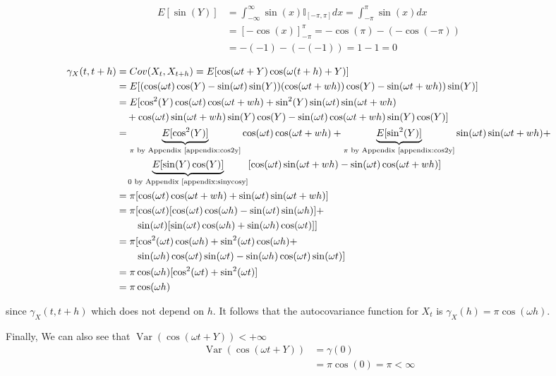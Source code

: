 \documentclass{article}
\DeclareMathOperator{\Var}{Var}
\begin{document}
\begin{align*}
E[\sin(Y)] &= \int_{-\infty}^{\infty} \sin(x) \mathbb{I}_{[-\pi, \pi]} dx = \int_{-\pi}^{\pi} \sin(x) dx\\
& = [-\cos(x)]^{\pi}_{-\pi} = -\cos(\pi) - (- \cos(-\pi)) \\
& = -(-1) - ( - (-1)) = 1 - 1 = 0
\end{align*}


\begin{align*}
\gamma_X(t,t + h) &= Cov(X_{t}, X_{t + h}) = E[\cos(\omega t + Y)\cos(\omega (t+h) + Y)] \\
 &= E[(\cos(\omega t)\cos(Y) - \sin(\omega t)\sin(Y))(\cos(\omega t + wh))\cos(Y) - \sin(\omega t + wh))\sin(Y)] \\
 &= E[\cos^2(Y)\cos(\omega t)\cos(\omega t + wh) + \sin^2(Y)\sin(\omega t)\sin(\omega t + wh)\\
 & \quad + \cos(\omega t)\sin(\omega t + wh)\sin(Y)\cos(Y) - \sin(\omega t)\cos(\omega t + wh)\sin(Y)\cos(Y)]\\
 & = \underbrace{E[\cos^2(Y)]}_{\pi \text{ by Appendix \ref{appendix:cos2y}}} \cos(\omega t)\cos(\omega t + wh) + \underbrace{E[\sin^2(Y)]}_{\pi \text{ by Appendix \ref{appendix:cos2y}}} \sin(\omega t)\sin(\omega t + wh) +\\
 & \quad \underbrace{E[\sin(Y)\cos(Y)]}_{\text{0 by Appendix \ref{appendix:sinycosy}}} [\cos(\omega t)\sin(\omega t + wh) - \sin(\omega t)\cos(\omega t + wh)]\\
 &= \pi [\cos(\omega t)\cos(\omega t + wh) + \sin(\omega t)\sin(\omega t + wh)]\\
 &= \pi [
 \cos(\omega t)[\cos(\omega t) \cos(\omega h) - \sin(\omega t) \sin(\omega h)] +\\
 &\qquad \sin(\omega t)[\sin(\omega t) \cos(\omega h) + \sin(\omega h) \cos(\omega t)]]\\
 &= \pi [
  \cos^2(\omega t) \cos(\omega h) + \sin^2(\omega t) \cos(\omega h) +\\
  &\qquad \sin(\omega h)\cos(\omega t)\sin(\omega t) - \sin(\omega h)\cos(\omega t)\sin(\omega t)
 ]\\
 &= \pi \cos(\omega h) [\cos^2(\omega t) + \sin^2(\omega t)]\\
 &= \pi \cos(\omega h)
 \end{align*}

 since $\gamma_X(t,t + h)$ which does not depend on $h$.
 It follows that the autocovariance function for $X_t$ is $\gamma_X(h) = \pi \cos(\omega h)$.

 Finally, We can also see that $\Var(\cos(\omega t + Y)) < +\infty$
 \begin{align*}
 \Var(\cos(\omega t + Y)) &= \gamma(0) \\
 &= \pi \cos(0) = \pi < \infty
 \end{align*}
\end{document}
